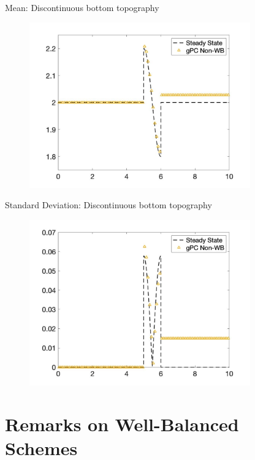 \documentclass[
    pdf,
    11pt,
    xcolor={svgnames},
  ]{beamer}
\begin{document}
\begin{frame}{Mean: Discontinuous bottom topography}
    \begin{figure}
    \centering
    \includegraphics[width=0.85\textwidth]{./Figures/burgers_dis_non_mean}
    \end{figure}
\end{frame}
\begin{frame}{Standard Deviation: Discontinuous bottom topography}
    \begin{figure}
    \centering
    \includegraphics[width=0.85\textwidth]{./Figures/burgers_dis_non_sd}
    \end{figure}
\end{frame}

\section{Remarks on Well-Balanced Schemes}
\end{document}
